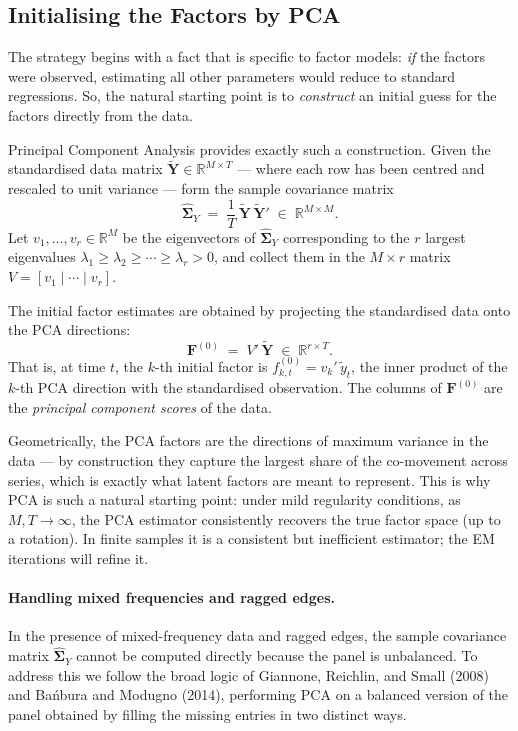 \documentclass[11pt, a4paper, oneside]{article}
\newcommand{\mY}{\mathbf{Y}}
\newcommand{\mF}{\mathbf{F}}
\begin{document}
\subsection{Initialising the Factors by PCA}

The strategy begins with a fact that is specific to factor models:
\emph{if} the factors were observed, estimating all other parameters
would reduce to standard regressions. So, the natural starting point is
to \emph{construct} an initial guess for the factors directly from the
data.

Principal Component Analysis provides exactly such a construction.
Given the standardised data matrix
$\tilde{\mY} \in \mathbb{R}^{M \times T}$ — where each row has been
centred and rescaled to unit variance — form the sample covariance
matrix
\[
\widehat{\boldsymbol{\Sigma}}_Y \;=\; \frac{1}{T}\,\tilde{\mY}\,\tilde{\mY}'
\;\in\; \mathbb{R}^{M \times M}.
\]
Let $v_1, \ldots, v_r \in \mathbb{R}^M$ be the eigenvectors of
$\widehat{\boldsymbol{\Sigma}}_Y$ corresponding to the $r$ largest
eigenvalues $\lambda_1 \geq \lambda_2 \geq \cdots \geq \lambda_r > 0$,
and collect them in the $M \times r$ matrix $V = [v_1 \mid \cdots \mid v_r]$.

The initial factor estimates are obtained by projecting the
standardised data onto the PCA directions:
\begin{equation}
\mF^{(0)} \;=\; V'\,\tilde{\mY} \;\in\; \mathbb{R}^{r \times T}.
\label{eq:init-F}
\end{equation}
That is, at time $t$, the $k$-th initial factor is
$f^{(0)}_{k,t} = v_k'\,\tilde{y}_t$, the inner product of the $k$-th
PCA direction with the standardised observation. The columns of
$\mF^{(0)}$ are the \emph{principal component scores} of the data.

Geometrically, the PCA factors are the directions of maximum variance
in the data — by construction they capture the largest share of the
co-movement across series, which is exactly what latent factors are
meant to represent. This is why PCA is such a natural starting point:
under mild regularity conditions, as $M, T \to \infty$, the PCA
estimator consistently recovers the true factor space (up to a
rotation). In finite samples it is a consistent but inefficient
estimator; the EM iterations will refine it.

\paragraph{Handling mixed frequencies and ragged edges.}
In the presence of mixed-frequency data and ragged edges, the sample 
covariance matrix $\widehat{\boldsymbol{\Sigma}}_Y$ cannot be computed 
directly because the panel is unbalanced. To address this we follow 
the broad logic of Giannone, Reichlin, and Small (2008) and Bańbura 
and Modugno (2014), performing PCA on a balanced version of the 
panel obtained by filling the missing entries in two distinct ways.
\end{document}

